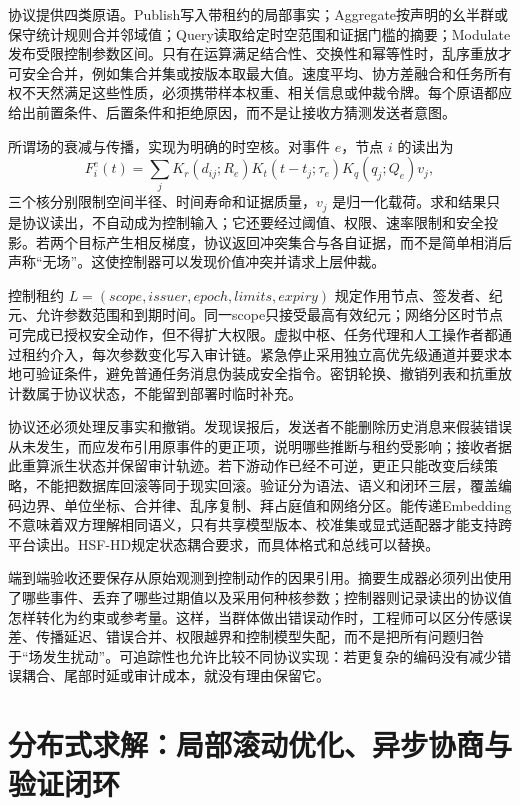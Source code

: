 协议提供四类原语。Publish写入带租约的局部事实；Aggregate按声明的幺半群或保守统计规则合并邻域值；Query读取给定时空范围和证据门槛的摘要；Modulate发布受限控制参数区间。只有在运算满足结合性、交换性和幂等性时，乱序重放才可安全合并，例如集合并集或按版本取最大值。速度平均、协方差融合和任务所有权不天然满足这些性质，必须携带样本权重、相关信息或仲裁令牌。每个原语都应给出前置条件、后置条件和拒绝原因，而不是让接收方猜测发送者意图。

所谓场的衰减与传播，实现为明确的时空核。对事件 $e$，节点 $i$ 的读出为
\[
 F_i^e(t)=\sum_jK_r(d_{ij};R_e)K_t(t-t_j;\tau_e)K_q(q_j;Q_e)v_j,
\]
三个核分别限制空间半径、时间寿命和证据质量，$v_j$ 是归一化载荷。求和结果只是协议读出，不自动成为控制输入；它还要经过阈值、权限、速率限制和安全投影。若两个目标产生相反梯度，协议返回冲突集合与各自证据，而不是简单相消后声称“无场”。这使控制器可以发现价值冲突并请求上层仲裁。

控制租约 $L=(scope,issuer,epoch,limits,expiry)$ 规定作用节点、签发者、纪元、允许参数范围和到期时间。同一scope只接受最高有效纪元；网络分区时节点可完成已授权安全动作，但不得扩大权限。虚拟中枢、任务代理和人工操作者都通过租约介入，每次参数变化写入审计链。紧急停止采用独立高优先级通道并要求本地可验证条件，避免普通任务消息伪装成安全指令。密钥轮换、撤销列表和抗重放计数属于协议状态，不能留到部署时临时补充。

协议还必须处理反事实和撤销。发现误报后，发送者不能删除历史消息来假装错误从未发生，而应发布引用原事件的更正项，说明哪些推断与租约受影响；接收者据此重算派生状态并保留审计轨迹。若下游动作已经不可逆，更正只能改变后续策略，不能把数据库回滚等同于现实回滚。验证分为语法、语义和闭环三层，覆盖编码边界、单位坐标、合并律、乱序复制、拜占庭值和网络分区。能传递Embedding不意味着双方理解相同语义，只有共享模型版本、校准集或显式适配器才能支持跨平台读出。HSF-HD规定状态耦合要求，而具体格式和总线可以替换。

端到端验收还要保存从原始观测到控制动作的因果引用。摘要生成器必须列出使用了哪些事件、丢弃了哪些过期值以及采用何种核参数；控制器则记录读出的协议值怎样转化为约束或参考量。这样，当群体做出错误动作时，工程师可以区分传感误差、传播延迟、错误合并、权限越界和控制模型失配，而不是把所有问题归咎于“场发生扰动”。可追踪性也允许比较不同协议实现：若更复杂的编码没有减少错误耦合、尾部时延或审计成本，就没有理由保留它。

\section{分布式求解：局部滚动优化、异步协商与验证闭环}
\label{sec:distributed_solver}


